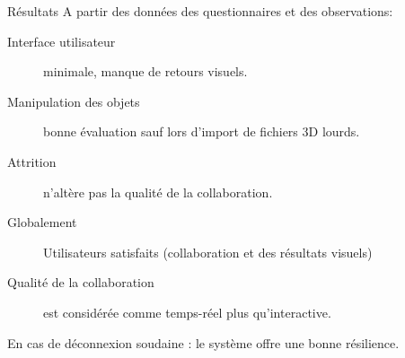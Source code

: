 \begin{frame}{Résultats}
A partir des données des questionnaires et des observations:
\begin{description}
	\item[Interface utilisateur] minimale, manque de retours visuels.
	\item[Manipulation des objets] bonne évaluation sauf lors d'import de fichiers 3D 
	lourds.
	\item[Attrition] n'altère pas la qualité de la collaboration.
	\item[Globalement] Utilisateurs satisfaits (collaboration et des résultats visuels)
	\item[Qualité de la collaboration] est considérée comme \alert{temps-réel} plus 
	qu'interactive.
\end{description}

En cas de déconnexion soudaine : le système offre une bonne résilience.


\end{frame}

